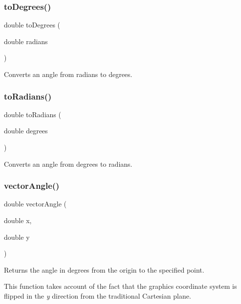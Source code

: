 \subsubsection{\texorpdfstring{to\+Degrees()}{toDegrees()}}
{\footnotesize\ttfamily double to\+Degrees (\begin{DoxyParamCaption}\item[{double}]{radians }\end{DoxyParamCaption})}



Converts an angle from radians to degrees. 

\mbox{\label{namespacesgl_1_1math_a8e8b5d1633dfb57d0d6056850bdd710c}} 
\subsubsection{\texorpdfstring{to\+Radians()}{toRadians()}}
{\footnotesize\ttfamily double to\+Radians (\begin{DoxyParamCaption}\item[{double}]{degrees }\end{DoxyParamCaption})}



Converts an angle from degrees to radians. 

\mbox{\label{namespacesgl_1_1math_a51453f572f4bc800c79c499d129c8c0d}} 
\subsubsection{\texorpdfstring{vector\+Angle()}{vectorAngle()}\hspace{0.1cm}{\footnotesize\ttfamily [1/2]}}
{\footnotesize\ttfamily double vector\+Angle (\begin{DoxyParamCaption}\item[{double}]{x,  }\item[{double}]{y }\end{DoxyParamCaption})}



Returns the angle in degrees from the origin to the specified point. 

This function takes account of the fact that the graphics coordinate system is flipped in the {\itshape y} direction from the traditional Cartesian plane. \mbox{\label{namespacesgl_1_1math_a2d623f59e6cb1d14a223c443403d568f}} 
